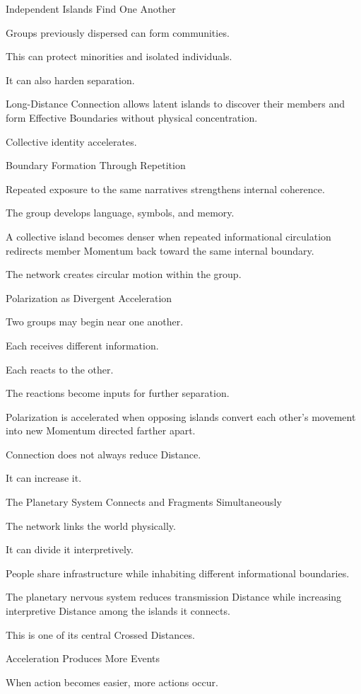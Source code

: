 Independent Islands Find One Another

Groups previously dispersed can form communities.

This can protect minorities and isolated individuals.

It can also harden separation.

Long-Distance Connection allows latent islands to discover their members and form Effective Boundaries without physical concentration.

Collective identity accelerates.

Boundary Formation Through Repetition

Repeated exposure to the same narratives strengthens internal coherence.

The group develops language, symbols, and memory.

A collective island becomes denser when repeated informational circulation redirects member Momentum back toward the same internal boundary.

The network creates circular motion within the group.

Polarization as Divergent Acceleration

Two groups may begin near one another.

Each receives different information.

Each reacts to the other.

The reactions become inputs for further separation.

Polarization is accelerated when opposing islands convert each other’s movement into new Momentum directed farther apart.

Connection does not always reduce Distance.

It can increase it.

The Planetary System Connects and Fragments Simultaneously

The network links the world physically.

It can divide it interpretively.

People share infrastructure while inhabiting different informational boundaries.

The planetary nervous system reduces transmission Distance while increasing interpretive Distance among the islands it connects.

This is one of its central Crossed Distances.

Acceleration Produces More Events

When action becomes easier, more actions occur.

